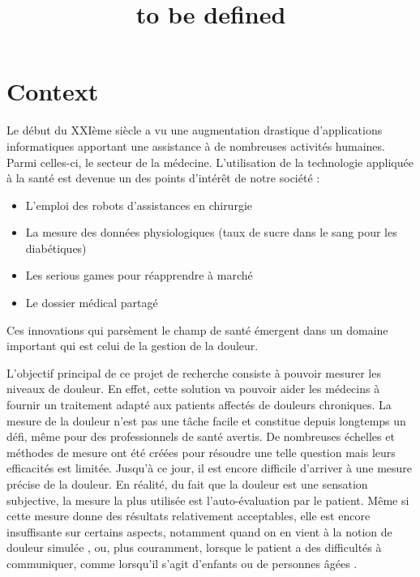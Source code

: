 \documentclass[11pt]{article}
\date{}
\title{to be defined}
\begin{document}
\maketitle

\section{Context}
\label{sec:orgf816e45}
Le début du XXIème siècle a vu une augmentation drastique d’applications
informatiques apportant une assistance à de nombreuses activités humaines.
Parmi celles-ci, le secteur de la médecine. L’utilisation de
la technologie appliquée à la santé est devenue un des points d’intérêt de notre société : 

\begin{itemize}
\item L’emploi des robots d'assistances en chirurgie
\item La mesure des données physiologiques (taux de sucre dans le sang pour les diabétiques)
\item Les serious games pour réapprendre à marché
\item Le dossier médical partagé
\end{itemize}

Ces innovations qui parsèment le champ de santé émergent dans un domaine
important qui est celui de la gestion de la douleur. 


L’objectif principal de ce projet de recherche  consiste à pouvoir mesurer
les niveaux de douleur. En effet, cette solution va pouvoir aider les
médecins à fournir un traitement adapté  aux patients affectés de douleurs
chroniques. La mesure de la douleur n’est pas une tâche facile et constitue
depuis longtemps un défi, même pour des professionnels de santé avertis. De
nombreuses échelles et méthodes de mesure ont été créées pour résoudre une
telle question
\cite{wong1996wong,mccaffery1999pain,portenoy1996visual,melzack1975mcgill,galer1997development,gracely1988descriptor}
mais leurs efficacités est limitée. Jusqu’à 
ce jour, il est encore difficile d’arriver à une mesure précise de la
douleur. En réalité, du fait que la douleur est une sensation subjective, la
mesure la plus utilisée est l’auto-évaluation par le patient. Même si cette
mesure donne
des résultats relativement acceptables, elle est encore insuffisante sur certains
aspects, notamment quand on en vient à la notion de douleur simulée \cite{gwen2007faces}, ou,
plus couramment, lorsque le patient a des difficultés à communiquer, comme
lorsqu’il s’agit d’enfants ou de personnes âgées \cite{lucey2011automatically}. 
\end{document}
